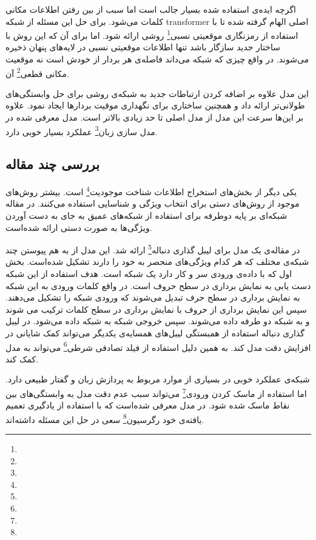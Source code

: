\documentclass[12pt, a4paper, oneside]{report}
\begin{document}
اگرچه ایده‌ی استفاده شده بسیار جالب است اما سبب از بین رفتن اطلاعات مکانی کلمات می‌شود. برای حل این
مسئله از شبکه
transformer
اصلی الهام گرفته شده تا با استفاده از
رمزنگاری موقعیتی نسبی\footnote{}
روشی ارائه شود. اما برای آن که این روش با ساختار جدید سازگار باشد تنها اطلاعات موقعیتی نسبی در
لایه‌های پنهان ذخیره می‌شوند. در واقع چیزی که شبکه می‌داند فاصله‌ی هر بردار از خودش است نه
موقعیت مکانی قطعی\footnote{}
آن.

این مدل علاوه بر اضافه کردن ارتباطات جدید به شبکه‌ی
روشی برای حل وابستگی‌های طولانی‌تر ارائه داد و همچنین ساختاری برای نگهداری موقیت بردارها ایجاد نمود. علاوه بر این‌ها
سرعت این مدل از مدل
اصلی تا حد زیادی بالاتر است. مدل معرفی شده در
مدل سازی زبان\footnote{}
عملکرد بسیار خوبی دارد.


\subsection{بررسی چند مقاله}

یکی دیگر از بخش‌های استخراج اطلاعات
شناخت موجودیت\footnote{}
است. بیشتر روش‌های موجود از روش‌های دستی برای انتخاب ویژگی و شناسایی استفاده می‌کنند. در مقاله
\cite{lample2016neural}
شبکه‌ای بر پایه
دوطرفه برای استفاده از شبکه‌های عمیق به جای به دست آوردن ویژگی‌ها به صورت دستی ارائه شده‌است. 

در مقاله‌ی
\cite{ma2016endtoend}
یک مدل
برای
لیبل گذاری دنباله\footnote{}
ارائه شد. این مدل از به هم پیوستن چند شبکه‌ی مختلف که هر کدام ویژگی‌های منحصر به خود را دارند
تشکیل شده‌است. بخش اول که با داده‌ی ورودی سر و کار دارد یک شبکه
است. هدف استفاده از این شبکه دست یابی به نمایش برداری در سطح حروف است. در واقع کلمات ورودی
به این شبکه به نمایش برداری در سطح حرف تبدیل می‌شوند که ورودی شبکه
را تشکیل می‌دهند.
سپس این نمایش برداری از حروف با نمایش برداری در سطح کلمات ترکیب می شوند و به شبکه
دو طرفه داده می‌شوند. سپس خروجی شبکه
به شبکه
داده می‌شود. در لیبل گذاری دنباله‌ استفاده از همبستگی لیبل‌های همسایه‌ی یکدیگر می‌تواند کمک شایانی در افزایش دقت مدل
کند. به همین دلیل استفاده از
فیلد تصادفی شرطی\footnote{}
می‌تواند به مدل کمک کند. 

شبکه‌ی
عملکرد خوبی در بسیاری از موارد مربوط به پردازش زبان و گفتار طبیعی دارد. اما استفاده از
ماسک کردن ورودی\footnote{}
می‌تواند سبب عدم دقت مدل به وابستگی‌های بین نقاط ماسک شده شود. در
\cite{yang2020xlnet}
مدل
معرفی شده‌است که با استفاده از
یادگیری تعمیم یافته‌ی خود رگرسیون\footnote{}
سعی در حل این مسئله داشته‌اند.
\end{document}
